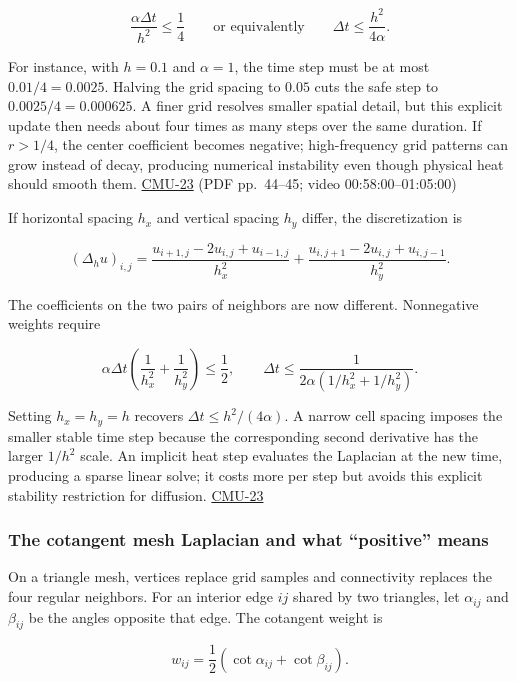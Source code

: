 \[
\frac{\alpha\Delta t}{h^2}\le\frac14
\qquad\text{or equivalently}\qquad
\Delta t\le\frac{h^2}{4\alpha}.
\]

For instance, with \(h=0.1\) and \(\alpha=1\), the time step must be at most \(0.01/4=0.0025\). Halving the grid spacing to \(0.05\) cuts the safe step to \(0.0025/4=0.000625\). A finer grid resolves smaller spatial detail, but this explicit update then needs about four times as many steps over the same duration. If \(r>1/4\), the center coefficient becomes negative; high-frequency grid patterns can grow instead of decay, producing numerical instability even though physical heat should smooth them. \hyperref[04-visual-computing-ii-ch036-cmu-23---physically-based-animation-and-pdes]{CMU-23} (PDF pp.~44--45; video 00:58:00--01:05:00)

If horizontal spacing \(h_x\) and vertical spacing \(h_y\) differ, the discretization is

\[
(\Delta_hu)_{i,j}=
\frac{u_{i+1,j}-2u_{i,j}+u_{i-1,j}}{h_x^2}
+\frac{u_{i,j+1}-2u_{i,j}+u_{i,j-1}}{h_y^2}.
\]

The coefficients on the two pairs of neighbors are now different. Nonnegative weights require

\[
\alpha\Delta t\left(\frac{1}{h_x^2}+\frac{1}{h_y^2}\right)\le\frac12,
\qquad
\Delta t\le\frac{1}{2\alpha(1/h_x^2+1/h_y^2)}.
\]

Setting \(h_x=h_y=h\) recovers \(\Delta t\le h^2/(4\alpha)\). A narrow cell spacing imposes the smaller stable time step because the corresponding second derivative has the larger \(1/h^2\) scale. An implicit heat step evaluates the Laplacian at the new time, producing a sparse linear solve; it costs more per step but avoids this explicit stability restriction for diffusion. \hyperref[04-visual-computing-ii-ch036-cmu-23---physically-based-animation-and-pdes]{CMU-23}

\subsubsection{The cotangent mesh Laplacian and what ``positive'' means}\label{04-visual-computing-ii-ch030-the-cotangent-mesh-laplacian-and-what-positive-means}

On a triangle mesh, vertices replace grid samples and connectivity replaces the four regular neighbors. For an interior edge \(ij\) shared by two triangles, let \(\alpha_{ij}\) and \(\beta_{ij}\) be the angles opposite that edge. The cotangent weight is

\[
w_{ij}=\frac12(\cot\alpha_{ij}+\cot\beta_{ij}).
\]

